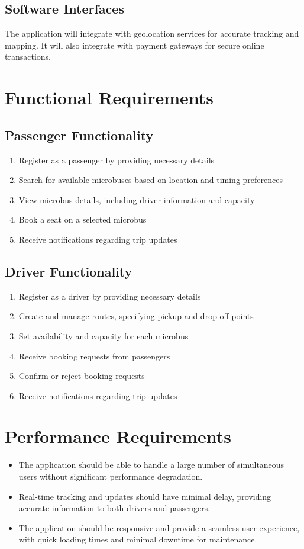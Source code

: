 \documentclass{BusMateSRS}
\begin{document}
\subsection{Software Interfaces}
The application will integrate with geolocation services for accurate tracking 
and mapping. It will also integrate with payment gateways for secure online 
transactions.

\section{Functional Requirements}
\subsection{Passenger Functionality}
\begin{enumerate}
  \item Register as a passenger by providing necessary details
  \item Search for available microbuses based on location and timing preferences
  \item View microbus details, including driver information and capacity
  \item Book a seat on a selected microbus
  \item Receive notifications regarding trip updates
\end{enumerate}

\subsection{Driver Functionality}
\begin{enumerate}
  \item Register as a driver by providing necessary details
  \item Create and manage routes, specifying pickup and drop-off points
  \item Set availability and capacity for each microbus
  \item Receive booking requests from passengers
  \item Confirm or reject booking requests
  \item Receive notifications regarding trip updates
\end{enumerate}

\section{Performance Requirements}
\begin{itemize}
  \item The application should be able to handle a large number of simultaneous 
    users without significant performance degradation.
  \item Real-time tracking and updates should have minimal delay, 
    providing accurate information to both drivers and passengers.
  \item The application should be responsive and provide a seamless user 
    experience, with quick loading times and minimal downtime for maintenance.
\end{itemize}
\end{document}
